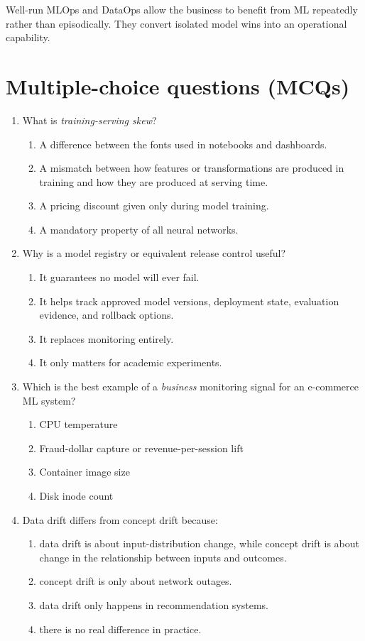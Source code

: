Well-run MLOps and DataOps allow the business to benefit from ML repeatedly rather than episodically.
They convert isolated model wins into an operational capability.

\section{Multiple-choice questions (MCQs)}
\begin{enumerate}
  \item What is \emph{training-serving skew}?
  \begin{enumerate}
    \item A difference between the fonts used in notebooks and dashboards.
    \item A mismatch between how features or transformations are produced in training and how they are produced at serving time.
    \item A pricing discount given only during model training.
    \item A mandatory property of all neural networks.
  \end{enumerate}

  \item Why is a model registry or equivalent release control useful?
  \begin{enumerate}
    \item It guarantees no model will ever fail.
    \item It helps track approved model versions, deployment state, evaluation evidence, and rollback options.
    \item It replaces monitoring entirely.
    \item It only matters for academic experiments.
  \end{enumerate}

  \item Which is the best example of a \emph{business} monitoring signal for an e-commerce ML system?
  \begin{enumerate}
    \item CPU temperature
    \item Fraud-dollar capture or revenue-per-session lift
    \item Container image size
    \item Disk inode count
  \end{enumerate}

  \item Data drift differs from concept drift because:
  \begin{enumerate}
    \item data drift is about input-distribution change, while concept drift is about change in the relationship between inputs and outcomes.
    \item concept drift is only about network outages.
    \item data drift only happens in recommendation systems.
    \item there is no real difference in practice.
  \end{enumerate}


\end{enumerate}
